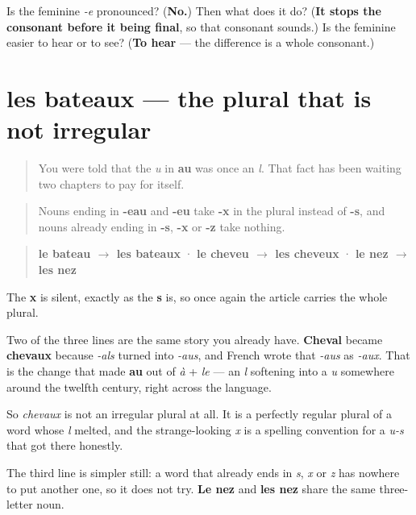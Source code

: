 \begin{tcolorbox}[breakable,colback=teal!4,colframe=teal!35!black,title={Before you move on}]
Is the feminine \emph{-e} pronounced? (\textbf{No.}) Then what does it do? (\textbf{It stops the consonant before it being final}, so that consonant sounds.) Is the feminine easier to hear or to see? (\textbf{To hear} — the difference is a whole consonant.)
\end{tcolorbox}
\section[les bateaux]{les bateaux — the plural that is not irregular}

\label{lesson:FR-C38-pluriel-x}



\begin{quote}
You were told that the \emph{u} in \textbf{au} was once an \emph{l}. That fact has been waiting two chapters to pay for itself.
\end{quote}

\begin{cousinweb}
\begin{quote}
Nouns ending in \textbf{-eau} and \textbf{-eu} take \textbf{-x} in the plural instead of \textbf{-s}, and nouns already ending in \textbf{-s}, \textbf{-x} or \textbf{-z} take nothing.
\end{quote}

\begin{quote}
\textbf{le bateau $\to$ les bateaux} · \textbf{le cheveu $\to$ les cheveux} · \textbf{le nez $\to$ les nez}
\end{quote}

The \textbf{x} is silent, exactly as the \textbf{s} is, so once again the article carries the whole plural.

Two of the three lines are the same story you already have. \textbf{Cheval} became \textbf{chevaux} because \emph{-als} turned into \emph{-aus}, and French wrote that \emph{-aus} as \emph{-aux}. That is the change that made \textbf{au} out of \emph{à} + \emph{le} — an \emph{l} softening into a \emph{u} somewhere around the twelfth century, right across the language.

So \emph{chevaux} is not an irregular plural at all. It is a perfectly regular plural of a word whose \emph{l} melted, and the strange-looking \emph{x} is a spelling convention for a \emph{u-s} that got there honestly.

The third line is simpler still: a word that already ends in \emph{s}, \emph{x} or \emph{z} has nowhere to put another one, so it does not try. \textbf{Le nez} and \textbf{les nez} share the same three-letter noun.
\end{cousinweb}

